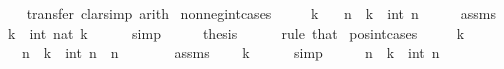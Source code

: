 \begin{isabellebody}
%
\isadelimproof
\ \ %
\endisadelimproof
%
\isatagproof
{}\isamarkupfalse%
\ transfer\ {\isacharparenleft}{\kern0pt}clarsimp{\isacharcomma}{\kern0pt}\ arith{\isacharparenright}{\kern0pt}%
\endisatagproof
{\isafoldproof}%
%
\isadelimproof
\isanewline
%
\endisadelimproof
\isanewline
{}\isamarkupfalse%
\ nonneg{\isacharunderscore}{\kern0pt}int{\isacharunderscore}{\kern0pt}cases{\isacharcolon}{\kern0pt}\isanewline
\ \ \ {\isachardoublequoteopen}{}\ {\isasymle}\ k{\isachardoublequoteclose}\isanewline
\ \ \ n\ \ {\isachardoublequoteopen}k\ {\isacharequal}{\kern0pt}\ int\ n{\isachardoublequoteclose}\isanewline
%
\isadelimproof
%
\endisadelimproof
%
\isatagproof
{}\isamarkupfalse%
\ {\isacharminus}{\kern0pt}\isanewline
\ \ \isamarkupfalse%
\ assms\ \isamarkupfalse%
\ {\isachardoublequoteopen}k\ {\isacharequal}{\kern0pt}\ int\ {\isacharparenleft}{\kern0pt}nat\ k{\isacharparenright}{\kern0pt}{\isachardoublequoteclose}\isanewline
\ \ \ \ \isamarkupfalse%
\ simp\isanewline
\ \ \isamarkupfalse%
\ \isamarkupfalse%
\ thesis\isanewline
\ \ \ \ \isamarkupfalse%
\ {\isacharparenleft}{\kern0pt}rule\ that{\isacharparenright}{\kern0pt}\isanewline
{}\isamarkupfalse%
%
\endisatagproof
{\isafoldproof}%
%
\isadelimproof
\isanewline
%
\endisadelimproof
\isanewline
{}\isamarkupfalse%
\ pos{\isacharunderscore}{\kern0pt}int{\isacharunderscore}{\kern0pt}cases{\isacharcolon}{\kern0pt}\isanewline
\ \ \ {\isachardoublequoteopen}{}\ {\isacharless}{\kern0pt}\ k{\isachardoublequoteclose}\isanewline
\ \ \ n\ \ {\isachardoublequoteopen}k\ {\isacharequal}{\kern0pt}\ int\ n{\isachardoublequoteclose}\ \ {\isachardoublequoteopen}n\ {\isachargreater}{\kern0pt}\ {}{\isachardoublequoteclose}\isanewline
%
\isadelimproof
%
\endisadelimproof
%
\isatagproof
{}\isamarkupfalse%
\ {\isacharminus}{\kern0pt}\isanewline
\ \ \isamarkupfalse%
\ assms\ \isamarkupfalse%
\ {\isachardoublequoteopen}{}\ {\isasymle}\ k{\isachardoublequoteclose}\isanewline
\ \ \ \ \isamarkupfalse%
\ simp\isanewline
\ \ \isamarkupfalse%
\ \isamarkupfalse%
\ n\ \ {\isachardoublequoteopen}k\ {\isacharequal}{\kern0pt}\ int\ n{\isachardoublequoteclose}\isanewline
\ \ \ \ \isamarkupfalse%

\end{isabellebody}
